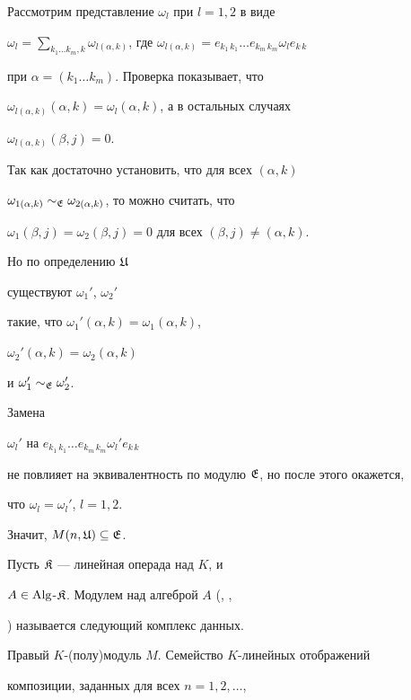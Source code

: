 \begin{pf}
Рассмотрим представление $\omega_l$ при $l=1,2$ в виде


$\omega_l=\sum\limits_{k_1\dotsc k_m,k}


\omega_{l(\alpha,k)}$, где $\omega_{l(\alpha,k)}=


e_{k_1\, k_1}\dotsc e_{k_m\, k_m}\omega_l e_{k\, k}$


при $\alpha=(k_1\dotsc k_m)$. Проверка показывает, что


$\omega_{l(\alpha,k)}(\alpha,k)=


\omega_l(\alpha,k)$, а в остальных случаях


$\omega_{l(\alpha,k)}(\beta,j)=0$.


Так как достаточно установить, что для всех $(\alpha,k)$\;


$\omega_{1(\alpha,k)}


\sim_{\frak E}\omega_{2(\alpha,k)}$, то можно считать, что


$\omega_1(\beta,j)=\omega_2(\beta,j)=0$ для всех $(\beta,j)\neq (\alpha,k)$.


Но по определению $\frak U$


существуют $\omega_1'$, $\omega_2'$


такие, что $\omega_1'(\alpha,k)=\omega_1(\alpha,k)$,


$\omega_2'(\alpha,k)=\omega_2(\alpha,k)$


и $\omega_1'\sim_{\frak E}\omega_2'$.


Замена


$\omega_l'$ на $e_{k_1\, k_1}\dotsc e_{k_m\, k_m}\omega_l' e_{k\, k}$


не повлияет на эквивалентность по модулю $\frak E$, но после этого окажется,


что $\omega_l=\omega_l'$, $l=1,2$.


Значит, $M(n,\frak U)\subseteq \frak E$.


\end{pf}





Пусть $\frak K$ --- линейная операда над $K$, и


$A\in \operatorname{Alg}$-$\frak K$. Модулем над алгеброй $A$ (\cite{GK}, \cite{May4},


\cite{May5}) называется следующий комплекс данных.


Правый $K$-(полу)модуль $M$. Семейство $K$-линейных отображений


композиции, заданных для всех $n=1,2,\dotsc$,


$$


